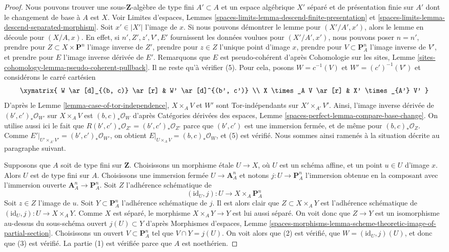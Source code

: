 \begin{proof}
Nous pouvons trouver une sous-$\mathbf{Z}$-algèbre de type fini $A' \subset A$
et un espace algébrique $X'$ séparé et de présentation finie sur $A'$
dont le changement de base à $A$ est $X$. Voir
Limites d'espaces, Lemmes
\ref{spaces-limits-lemma-descend-finite-presentation} et
\ref{spaces-limits-lemma-descend-separated-morphism}.
Soit $x' \in |X'|$ l'image de $x$.
Si nous pouvons démontrer le lemme pour $(X'/A', x')$, alors
le lemme en découle pour $(X/A, x)$.
En effet, si $n', Z', z', V', E'$ fournissent les données voulues
pour $(X'/A', x')$, nous pouvons poser
$n = n'$,
prendre pour $Z \subset X \times \mathbf{P}^n$ l'image inverse de $Z'$,
prendre pour $z \in Z$ l'unique point d'image $x$,
prendre pour $V \subset \mathbf{P}^n_A$ l'image inverse de $V'$, et
prendre pour $E$ l'image inverse dérivée de $E'$.
Remarquons que $E$ est pseudo-cohérent d'après
Cohomologie sur les sites, Lemme
\ref{sites-cohomology-lemma-pseudo-coherent-pullback}.
Il ne reste qu'à vérifier (5). Pour cela,
posons $W = c^{-1}(V)$ et $W' = (c')^{-1}(V')$
et considérons le carré cartésien
$$
\xymatrix{
W \ar[d]_{(b, c)} \ar[r] & W' \ar[d]^{(b', c')} \\
X \times_A V \ar[r] & X' \times_{A'} V'
}
$$
D'après le Lemme \ref{lemma-case-of-tor-independence}, $X \times_A V$ et $W'$
sont Tor-indépendants sur $X' \times_{A'} V'$.
Ainsi, l'image inverse dérivée de
$(b', c')_*\mathcal{O}_{W'}$ sur $X \times_A V$
est $(b, c)_*\mathcal{O}_W$ d'après
Catégories dérivées des espaces,
Lemme \ref{spaces-perfect-lemma-compare-base-change}.
On utilise aussi ici le fait que $R(b', c')_*\mathcal{O}_{Z'} = (b', c')_*\mathcal{O}_{Z'}$
parce que $(b', c')$ est une immersion fermée, et de même pour
$(b, c)_*\mathcal{O}_Z$.
Comme $E'|_{U' \times_{A'} V'} =
(b', c')_*\mathcal{O}_{W'}$, on obtient
$E|_{U \times_A V} = (b, c)_*\mathcal{O}_W$,
et (5) est vérifié.
Nous sommes ainsi ramenés à la situation décrite au
paragraphe suivant.

\medskip\noindent
Supposons que $A$ soit de type fini sur $\mathbf{Z}$.
Choisissons un morphisme \'etale $U \to X$, où $U$ est un schéma affine,
et un point $u \in U$ d'image $x$. Alors $U$ est de type fini sur $A$.
Choisissons une immersion fermée $U \to \mathbf{A}^n_A$ et notons
$j : U \to \mathbf{P}^n_A$ l'immersion obtenue en la composant
avec l'immersion ouverte $\mathbf{A}^n_A \to \mathbf{P}^n_A$.
Soit $Z$ l'adhérence schématique de
$$
(\text{id}_U, j) : U \longrightarrow X \times_A \mathbf{P}^n_A
$$
Soit $z \in Z$ l'image de $u$.
Soit $Y \subset \mathbf{P}^n_A$ l'adhérence schématique
de $j$. Il est alors clair que $Z \subset X \times_A Y$
est l'adhérence schématique de
$(\text{id}_U, j) : U \to X \times_A Y$.
Comme $X$ est séparé, le morphisme
$X \times_A Y \to Y$ est lui aussi séparé.
On voit donc que $Z \to Y$ est un isomorphisme au-dessus
du sous-schéma ouvert $j(U) \subset Y$ d'après
Morphismes d'espaces, Lemme
\ref{spaces-morphisms-lemma-scheme-theoretic-image-of-partial-section}.
Choisissons un ouvert $V \subset \mathbf{P}^n_A$ tel que $V \cap Y = j(U)$.
On voit alors que (2) est vérifié, que $W = (\text{id}_U, j)(U)$, et donc
que (3) est vérifié. La partie (1) est vérifiée parce que $A$ est noethérien.


\end{proof}
